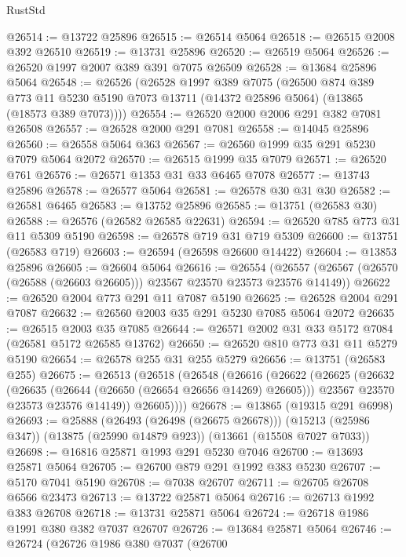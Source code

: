 \begin{lexlean}{RustStd}
\begin{coremodule}
@26514 := @13722 @25896
@26515 := @26514 @5064
@26518 := @26515 @2008 @392 @26510
@26519 := @13731 @25896
@26520 := @26519 @5064
@26526 := @26520 @1997 @2007 @389 @391 @7075 @26509
@26528 := @13684 @25896 @5064
@26548 := @26526
    (@26528
      @1997
      @389
      @7075
      (@26500
        @874
        @389
        @773
        @11
        @5230
        @5190
        @7073
        @13711
        (@14372 @25896 @5064)
        (@13865 (@18573 @389 @7073))))
@26554 := @26520 @2000 @2006 @291 @382 @7081 @26508
@26557 := @26528 @2000 @291 @7081
@26558 := @14045 @25896
@26560 := @26558 @5064 @363
@26567 := @26560 @1999 @35 @291 @5230 @7079 @5064 @2072
@26570 := @26515 @1999 @35 @7079
@26571 := @26520 @761
@26576 := @26571 @1353 @31 @33 @6465 @7078
@26577 := @13743 @25896
@26578 := @26577 @5064
@26581 := @26578 @30 @31 @30
@26582 := @26581 @6465
@26583 := @13752 @25896
@26585 := @13751 (@26583 @30)
@26588 := @26576 (@26582 @26585 @22631)
@26594 := @26520 @785 @773 @31 @11 @5309 @5190
@26598 := @26578 @719 @31 @719 @5309
@26600 := @13751 (@26583 @719)
@26603 := @26594 (@26598 @26600 @14422)
@26604 := @13853 @25896
@26605 := @26604 @5064
@26616 := @26554
    (@26557 (@26567 (@26570 (@26588 (@26603 @26605))) @23567 @23570 @23573 @23576 @14149))
@26622 := @26520 @2004 @773 @291 @11 @7087 @5190
@26625 := @26528 @2004 @291 @7087
@26632 := @26560 @2003 @35 @291 @5230 @7085 @5064 @2072
@26635 := @26515 @2003 @35 @7085
@26644 := @26571 @2002 @31 @33 @5172 @7084 (@26581 @5172 @26585 @13762)
@26650 := @26520 @810 @773 @31 @11 @5279 @5190
@26654 := @26578 @255 @31 @255 @5279
@26656 := @13751 (@26583 @255)
@26675 := @26513
    (@26518
      (@26548
        (@26616
          (@26622
            (@26625
              (@26632
                (@26635 (@26644 (@26650 (@26654 @26656 @14269) @26605)))
                @23567
                @23570
                @23573
                @23576
                @14149))
            @26605))))
@26678 := @13865 (@19315 @291 @6998)
@26693 := @25888
    (@26493 (@26498 (@26675 @26678)))
    (@15213 (@25986 @347))
    (@13875 (@25990 @14879 @923))
    (@13661 (@15508 @7027 @7033))
@26698 := @16816 @25871 @1993 @291 @5230 @7046
@26700 := @13693 @25871 @5064
@26705 := @26700 @879 @291 @1992 @383 @5230
@26707 := @5170 @7041 @5190
@26708 := @7038 @26707
@26711 := @26705 @26708 @6566 @23473
@26713 := @13722 @25871 @5064
@26716 := @26713 @1992 @383 @26708
@26718 := @13731 @25871 @5064
@26724 := @26718 @1986 @1991 @380 @382 @7037 @26707
@26726 := @13684 @25871 @5064
@26746 := @26724
    (@26726
      @1986
      @380
      @7037
      (@26700

\end{coremodule}
\end{lexlean}
